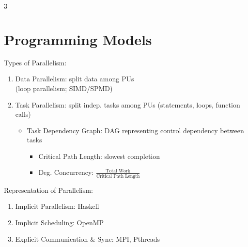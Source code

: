 \documentclass[12pt, a4paper]{article}
\begin{document}
\begin{multicols*}{3}
\colbreak
\section{Programming Models}

Types of Parallelism:
\begin{enumerate}[\roman*.]
  \item Data Parallelism: split data among PUs\\(loop parallelism; SIMD/SPMD)
  \item Task Parallelism: split indep. tasks among PUs (statements, loops, function calls)
    \begin{itemize}[leftmargin=*]\vspace{3pt}
      \item Task Dependency Graph: DAG representing control dependency between tasks
        \begin{itemize}[leftmargin=*]\vspace{3pt}
          \item Critical Path Length: slowest completion
          \item Deg. Concurrency: $\displaystyle \frac{\text{Total Work}}{\text{Critical Path Length}}$
        \end{itemize}
    \end{itemize}
\end{enumerate}

Representation of Parallelism:
\begin{enumerate}[\roman*.]
  \item Implicit Parallelism: Haskell
  \item Implicit Scheduling: OpenMP
  \item Explicit Communication \& Sync: MPI, Pthreads
\end{enumerate}


\end{multicols*}
\end{document}
